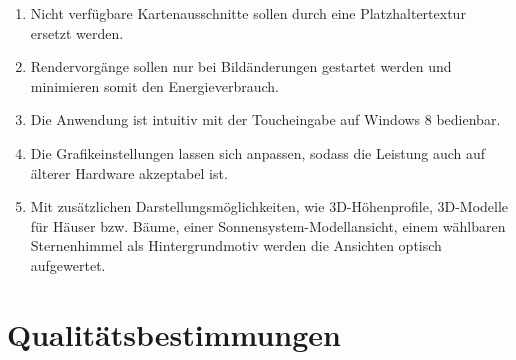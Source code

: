 \documentclass[10pt]{scrreprt}
\begin{document}
\begin{enumerate}[leftmargin=2.5cm]
\wunsch
\item Nicht verfügbare Kartenausschnitte sollen durch eine Platzhaltertextur ersetzt werden.
\item Rendervorgänge sollen nur bei Bildänderungen gestartet werden und minimieren somit den Energieverbrauch.
\item Die Anwendung ist intuitiv mit der Toucheingabe auf Windows 8 bedienbar.
\item Die Grafikeinstellungen lassen sich anpassen, sodass die Leistung auch auf älterer Hardware akzeptabel ist.
\item Mit zusätzlichen Darstellungsmöglichkeiten, wie 3D-Höhenprofile, 3D-Modelle für Häuser bzw. Bäume, einer Sonnensystem-Modellansicht, einem wählbaren Sternenhimmel als Hintergrundmotiv werden die Ansichten optisch aufgewertet.
\end{enumerate}



\chapter{Qualitätsbestimmungen}
\end{document}
